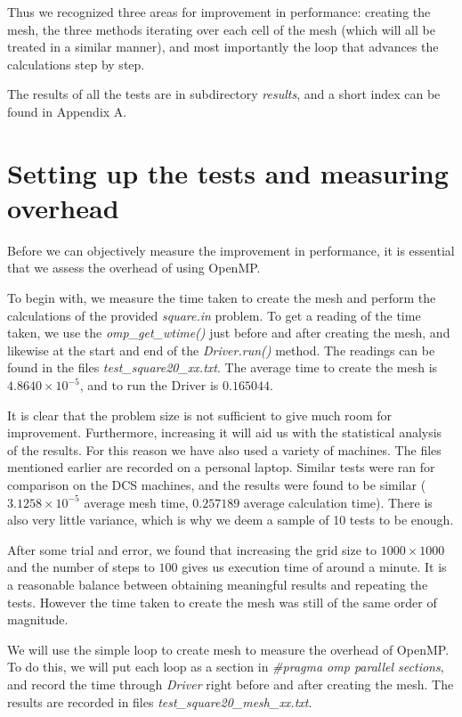 \documentclass[11pt,journal]{IEEEtran}
\begin{document}
	Thus we recognized three areas for improvement in performance: creating the mesh, the three methods iterating over each cell of the mesh (which will all be treated in a similar manner), and most importantly the loop that advances the calculations step by step. 
	
	The results of all the tests are in subdirectory \emph{results}, and a short index can be found in Appendix A.
	
	\section{Setting up the tests and measuring overhead}
	Before we can objectively measure the improvement in performance, it is essential that we assess the overhead of using OpenMP. 
	
	To begin with, we measure the time taken to create the mesh and perform the calculations of the provided \emph{square.in} problem. To get a reading of the time taken, we use the \emph{omp\_get\_wtime()} just before and after creating the mesh, and likewise at the start and end of the \emph{Driver.run()} method. The readings can be found in the files \emph{test\_square20\_xx.txt}. The average time to create the mesh is $4.8640 \times 10^{-5}$, and to run the Driver is $0.165044$.
	
	It is clear that the problem size is not sufficient to give much room for improvement. Furthermore, increasing it will aid us with the statistical analysis of the results. For this reason we have also used a variety of machines. The files mentioned earlier are recorded on a personal laptop. Similar tests were ran for comparison on the DCS machines, and the results were found to be similar ($3.1258 \times 10^{-5}$ average mesh time, $0.257189$ average calculation time). There is also very little variance, which is why we deem a sample of 10 tests to be enough.
	
	After some trial and error, we found that increasing the grid size to $1000 \times 1000$ and the number of steps to $100$ gives us execution time of around a minute. It is a reasonable balance between obtaining meaningful results and repeating the tests. However the time taken to create the mesh was still of the same order of magnitude.
	
	We will use the simple loop to create mesh to measure the overhead of OpenMP. To do this, we will put each loop as a section in \emph{\#pragma omp parallel sections}, and record the time through \emph{Driver} right before and after creating the mesh. The results are recorded in files \emph{test\_square20\_mesh\_xx.txt}.
	
\end{document}
